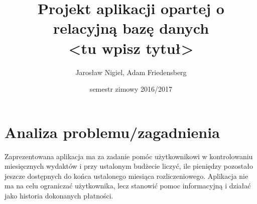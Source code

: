 \documentclass{article}
\title{\textbf{Projekt aplikacji opartej o relacyjną bazę danych} \\ \normalsize{<tu wpisz tytuł>}}
\author{Jarosław Nigiel, Adam Friedensberg}
\date{semestr zimowy 2016/2017}
\begin{document}
	\maketitle
    
    
    \section{Analiza problemu/zagadnienia}
    Zaprezentowana aplikacja ma za zadanie pomóc użytkownikowi w kontrolowaniu miesięcznych wydaktów i przy ustalonym budżecie liczyć, ile pieniędzy pozostało jeszcze dostępnych do końca ustalonego miesiąca rozliczeniowego. Aplikacja nie ma na celu ograniczać użytkownika, lecz stanowić pomoc informacyjną i działać jako historia dokonanych płatności.
    
\end{document}
